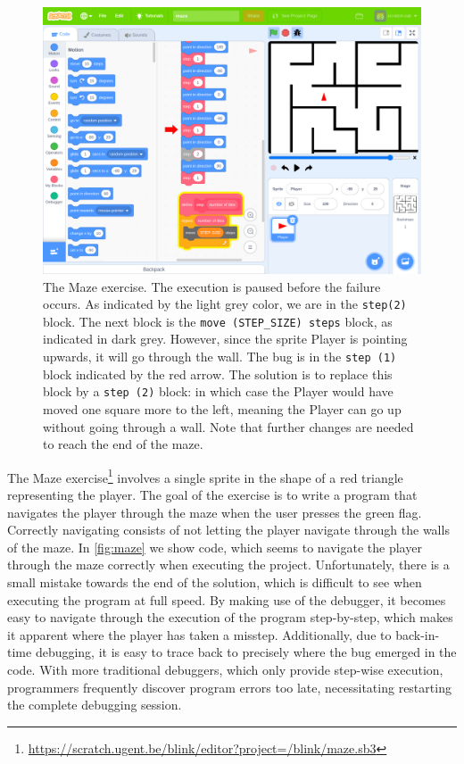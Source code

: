 \documentclass[../main]{subfiles}
\begin{document}
\begin{figure}
    \begin{wide}
        \includegraphics[width=\linewidth]{maze}
    \end{wide}
    \caption{
        The Maze exercise.
        The execution is paused before the failure occurs.
        As indicated by the light grey color, we are in the \texttt{step(2)} block.
        The next block is the \texttt{move (STEP\_SIZE) steps} block, as indicated in dark grey.
        However, since the sprite Player is pointing upwards, it will go through the wall.
        The bug is in the \texttt{step (1)} block indicated by the red arrow.
        The solution is to replace this block by a \texttt{step (2)} block: in which case the Player would have moved one square more to the left, meaning the Player can go up without going through a wall.
        Note that further changes are needed to reach the end of the maze.
    }
    \label{fig:maze}
\end{figure}

The Maze exercise\footnote{\url{https://scratch.ugent.be/blink/editor?project=/blink/maze.sb3}} involves a single sprite in the shape of a red triangle representing the player.
The goal of the exercise is to write a program that navigates the player through the maze when the user presses the green flag.
Correctly navigating consists of not letting the player navigate through the walls of the maze.
In \vref{fig:maze} we show code, which seems to navigate the player through the maze correctly when executing the project.
Unfortunately, there is a small mistake towards the end of the solution, which is difficult to see when executing the program at full speed.
By making use of the debugger, it becomes easy to navigate through the execution of the program step-by-step, which makes it apparent where the player has taken a misstep.
Additionally, due to back-in-time debugging, it is easy to trace back to precisely where the bug emerged in the code.
With more traditional debuggers, which only provide step-wise execution, programmers frequently discover program errors too late, necessitating restarting the complete debugging session.
\end{document}
